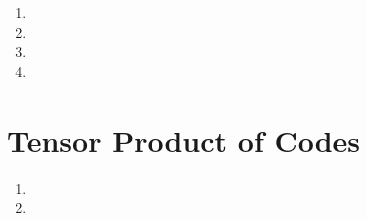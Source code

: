 \documentclass[12pt]{article}
\begin{document}
\begin{enumerate}
\item %

\item %

\item %

\item %

\end{enumerate}

\section{Tensor Product of Codes}

\begin{enumerate}
\item %

\item %

\end{enumerate}
\end{document}
